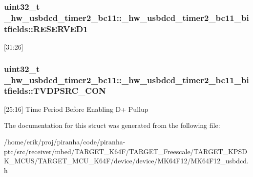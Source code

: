 \subsubsection[{\texorpdfstring{R\+E\+S\+E\+R\+V\+E\+D1}{RESERVED1}}]{\setlength{\rightskip}{0pt plus 5cm}uint32\+\_\+t \+\_\+hw\+\_\+usbdcd\+\_\+timer2\+\_\+bc11\+::\+\_\+hw\+\_\+usbdcd\+\_\+timer2\+\_\+bc11\+\_\+bitfields\+::\+R\+E\+S\+E\+R\+V\+E\+D1}\hypertarget{struct__hw__usbdcd__timer2__bc11_1_1__hw__usbdcd__timer2__bc11__bitfields_aba66d54c42da7f6144fd1c8a4b75dc95}{}\label{struct__hw__usbdcd__timer2__bc11_1_1__hw__usbdcd__timer2__bc11__bitfields_aba66d54c42da7f6144fd1c8a4b75dc95}
\mbox{[}31\+:26\mbox{]} 
\subsubsection[{\texorpdfstring{T\+V\+D\+P\+S\+R\+C\+\_\+\+C\+ON}{TVDPSRC_CON}}]{\setlength{\rightskip}{0pt plus 5cm}uint32\+\_\+t \+\_\+hw\+\_\+usbdcd\+\_\+timer2\+\_\+bc11\+::\+\_\+hw\+\_\+usbdcd\+\_\+timer2\+\_\+bc11\+\_\+bitfields\+::\+T\+V\+D\+P\+S\+R\+C\+\_\+\+C\+ON}\hypertarget{struct__hw__usbdcd__timer2__bc11_1_1__hw__usbdcd__timer2__bc11__bitfields_a0aff47fbb895264ad00acb80f42dea59}{}\label{struct__hw__usbdcd__timer2__bc11_1_1__hw__usbdcd__timer2__bc11__bitfields_a0aff47fbb895264ad00acb80f42dea59}
\mbox{[}25\+:16\mbox{]} Time Period Before Enabling D+ Pullup 

The documentation for this struct was generated from the following file\+:\begin{DoxyCompactItemize}
\item 
/home/erik/proj/piranha/code/piranha-\/ptc/src/receiver/mbed/\+T\+A\+R\+G\+E\+T\+\_\+\+K64\+F/\+T\+A\+R\+G\+E\+T\+\_\+\+Freescale/\+T\+A\+R\+G\+E\+T\+\_\+\+K\+P\+S\+D\+K\+\_\+\+M\+C\+U\+S/\+T\+A\+R\+G\+E\+T\+\_\+\+M\+C\+U\+\_\+\+K64\+F/device/device/\+M\+K64\+F12/M\+K64\+F12\+\_\+usbdcd.\+h\end{DoxyCompactItemize}
